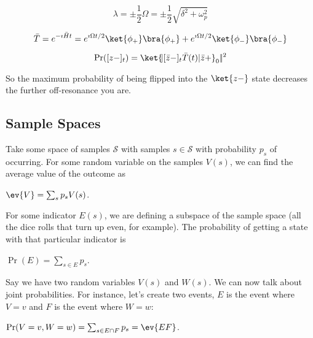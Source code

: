 \documentclass[a4paper,twoside,master.tex]{subfiles}
\begin{document}
\begin{equation}
\lambda = \pm\frac{1}{2}\Omega = \pm\frac{1}{2}\sqrt{\delta^2+\omega_p^2}
\end{equation}

\begin{equation}
\bar{T} = e^{-\imath\bar{H}t} = e^{\imath\Omega t/2}\ket{\phi_+}\bra{\phi_+} + e^{\imath\Omega t/2}\ket{\phi_-}\bra{\phi_-}
\end{equation}

\begin{equation}
\Pr([z-]_t) = \ket{\!|[\bar{z}-]_t\bar{T}(t)|\bar{z}+}_0|\!|^2
\end{equation}

So the maximum probability of being flipped into the $\ket{z-}$
state decreases the further off-resonance you are.



\subsection{Sample Spaces}
\label{sub:sample_spaces}

Take some space of samples $\mathcal{S}$ with samples
$s\in\mathcal{S}$ with probability $p_s$ of occurring. For some
random variable on the samples $V(s)$, we can find the average value
of the outcome as

$\ev{V} = \sum_s p_s V(s)$.

For some indicator $E(s)$, we are defining a subspace of the sample
space (all the dice rolls that turn up even, for example). The
probability of getting a state with that particular indicator is

$\Pr(E) = \sum_{s\in E}p_s$.

Say we have two random variables $V(s)$ and $W(s)$. We can now talk
about joint probabilities. For instance, let's create two events, $E$
is the event where $V=v$ and $F$ is the event where $W=w$:

$\Pr(V=v,W=w) = \sum_{s\in E\cap F}p_s = \ev{EF}$.
\end{document}
